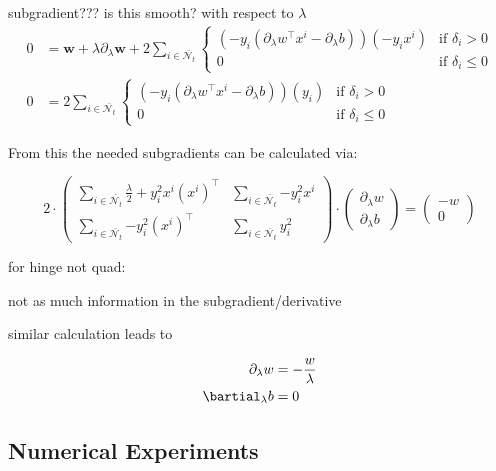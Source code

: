 subgradient??? is this smooth? with respect to \(\lambda\)
\begin{align}
	0 &= \bm{w}+\lambda\partial_{\lambda}\bm{w}+2\sum_{i \in \bar{\mathcal{N}_t}}{\left\{\begin{array}{cl} (-y_i(\partial_{\lambda}w^{\top}x^i-\partial_{\lambda}b))(-y_ix^i) & \text{if } \delta_i >0 \\ 0 & \text{if } \delta_i \leq 0 \end{array} \right.} \\
	0 &= 2\sum_{i \in \bar{\mathcal{N}_t}}{\left\{\begin{array}{cl} (-y_i(\partial_{\lambda}w^{\top}x^i-\partial_{\lambda}b))(y_i) & \text{if } \delta_i >0 \\ 0 & \text{if } \delta_i \leq 0 \end{array} \right.}
\end{align}

From this the needed subgradients can be calculated via:

\begin{equation}
	2\cdot\begin{pmatrix} \sum_{i \in \bar{\mathcal{N}_t}}\frac{\lambda}{2}+{y_i^2x^i(x^i)^{\top}} & \sum_{i \in \bar{\mathcal{N}_t}}	{-y_i^2x^i} \\ \sum_{i \in \bar{\mathcal{N}_t}}{-y_i^2(x^i)^{\top}} & \sum_{i \in \bar{\mathcal{N}_t}}{y_i^2}\end{pmatrix}
	\cdot \begin{pmatrix} \partial_{\lambda}w \\ \partial_{\lambda}b\end{pmatrix}
	= \begin{pmatrix}-w \\ 0\end{pmatrix}
\label{subgr_wb}
\end{equation}

for hinge not quad:

not as much information in the subgradient/derivative

similar calculation leads to 

\begin{align}
	\partial_{\lambda}w &= -\frac{w}{\lambda} \\
	\bartial_{\lambda}b &= 0
\end{align}

\subsection{Numerical Experiments}

